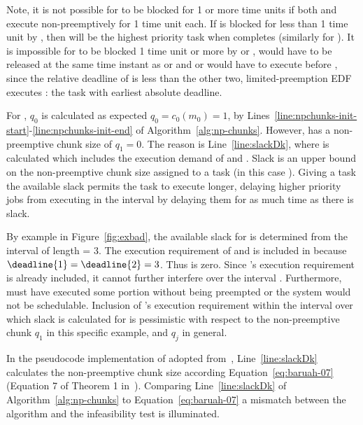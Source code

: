 Note, it is not possible for  to be blocked for 1
or more time units if both  and  execute
non-preemptively for 1 time unit each. If  is blocked for less
than 1 time unit by , then  will be the highest
priority task when  completes (similarly for ). It is
impossible for  to be blocked 1 time unit or more by 
or ,  would have to be released at the same time
instant as  or  and  or  would have to
execute before , since the relative deadline of  is
less than the other two, limited-preemption EDF executes : the
task with earliest absolute deadline.

For , ${q_0}$ is calculated as expected
${q_0 = c_0(m_0) = 1}$, by
Lines~\ref{line:npchunks-init-start}-\ref{line:npchunks-init-end} of
Algorithm~\ref{alg:np-chunks}. However,  has a non-preemptive
chunk size of ${q_1 = 0}$. The reason is Line~\ref{line:slackDk},
where  is calculated which includes the execution
demand of  and . Slack is an upper bound on
the non-preemptive chunk size assigned to a task (in this case
). Giving a task the available slack permits the task to
execute longer, delaying higher priority jobs from executing in the
interval by delaying them for as much time as there is slack.

By example in Figure~\ref{fig:exbad}, the available slack for 
is determined from the interval of length  = 3. The
execution requirement of  and  is included
in  because ${\deadline{1} = \deadline{2} = 3}$. Thus
 is zero. Since 's execution requirement
is already included, it cannot 
further interfere over the interval . Furthermore,
 must have executed some portion without being preempted or
the system would not be schedulable. Inclusion of 's execution
requirement within the interval over which slack is calculated for is
pessimistic with respect to the non-preemptive chunk ${q_1}$ in this
specific example, and ${q_j}$ in general.


In the pseudocode implementation of \npchunks{} adopted
from~\cite{Baruah:2005}, Line~\ref{line:slackDk} calculates the
non-preemptive chunk size according Equation~\ref{eq:baruah-07}
(Equation 7 of Theorem 1 in~\cite{Baruah:2005}). Comparing
Line~\ref{line:slackDk} of Algorithm~\ref{alg:np-chunks} to
Equation~\ref{eq:baruah-07} a mismatch between the algorithm and the
infeasibility test is illuminated. 

